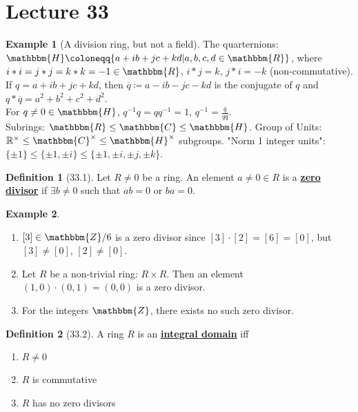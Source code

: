 \documentclass{article}
\newcommand{\Z}{\mathbbm{Z}}
\newcommand{\R}{\mathbbm{R}}
\newcommand{\C}{\mathbbm{C}}
\newcommand{\coleq}{\coloneqq}
\newcommand{\inverse}[1]{#1^{-1}}
\newcommand{\define}[1]{\textbf{\underline{#1}}}
\theoremstyle{definition}
\newtheorem*{defn}{Definition}
\newtheorem*{ex}{Example}
\theoremstyle{remark}
\newcommand{\Rx}{\mathbb{R}^\times}
\renewcommand{\H}{\mathbbm{H}}
\begin{document}
    \section*{Lecture 33}{
        \begin{ex}[A division ring, but not a field]
            The quarternions: $\H\coleq\{a+ib+jc+kd|a,b,c,d\in \R\}$, where $i*i=j*j=k*k=-1 \in \R$, $i*j=k$, $j*i=-k$ (non-commutative). If $q=a+ib+jc+kd$, then $\overline{q}\coleq a-ib-jc-kd$ is the conjugate of $q$ and $q*\overline{q}=a^2+b^2+c^2+d^2$.\\ For $q\neq 0 \in \H$, $\inverse{q}q=q\inverse{q}=1$, $\inverse{q}=\frac{\overline{q}}{q\overline{q}}$.\\
            Subrings: $\R \leq \C \leq \H$. Group of Units: $\Rx\leq \C^\times \leq \H^\times$ subgroups. "Norm 1 integer units": $\{\pm1\} \leq \{\pm1,\pm i\} \leq \{\pm1, \pm i, \pm j, \pm k\}$.
        \end{ex}
        
        \begin{defn}[33.1]
            Let $R\neq 0$ be a ring. An element $a \neq 0 \in R$ is a \define{zero divisor} if $\exists b \neq 0$ such that $ab=0$ or $ba=0$.
        \end{defn}
        
        \begin{ex}
            \begin{enumerate}
                \item $[3]\in \Z/6$ is a zero divisor since $[3]\cdot[2]=[6]=[0]$, but $[3]\neq[0]$, $[2] \neq [0]$.
                \item Let $R$ be a non-trivial ring: $R\times R$. Then an element $(1,0)\cdot(0,1)=(0,0)$ is a zero divisor.
                \item For the integers $\Z$, there exists no such zero divisor.
            \end{enumerate}
        \end{ex}
        
        \begin{defn}[33.2]
            A ring $R$ is an \define{integral domain} iff
            \begin{enumerate}
                \item $R \neq 0$
                \item $R$ is commutative
                \item $R$ has no zero divisors
            \end{enumerate}
        \end{defn}
        
}
\end{document}
